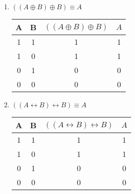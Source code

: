 \documentclass{article}
\begin{document}
\begin{enumerate}
    \item $((A \oplus B) \oplus B ) \equiv A$
    \begin{table}[h!]
        \centering
        \begin{tabular}{|c|c|c||c|}
            \hline
            \textbf{A} & \textbf{B} & \textbf{$((A \oplus B) \oplus B )$} & \textbf{$A$}\\
            \hline
            1 & 1 & 1 & 1 \\
            \hline
            1 & 0 & 1 & 1 \\
            \hline
            0 & 1 & 0 & 0 \\
            \hline
            0 & 0 & 0 & 0 \\
            \hline
        \end{tabular}
    \end{table}

    \item $((A \leftrightarrow B) \leftrightarrow B) \equiv A$
    \begin{table}[h!]
        \centering
        \begin{tabular}{|c|c|c||c|}
            \hline
            \textbf{A} & \textbf{B} & \textbf{$((A \leftrightarrow B) \leftrightarrow B)$} & \textbf{$A$}\\
            \hline
            1 & 1 & 1 & 1 \\
            \hline
            1 & 0 & 1 & 1 \\
            \hline
            0 & 1 & 0 & 0 \\
            \hline
            0 & 0 & 0 & 0 \\
            \hline
        \end{tabular}
    \end{table}

\end{enumerate}
\end{document}
